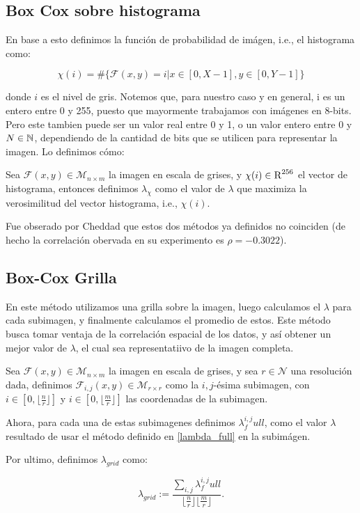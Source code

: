     \subsection{Box Cox sobre histograma}

    En base a esto definimos la funci\'on de probabilidad de im\'agen, i.e., el histograma como:
    
    $$\chi(i)= \# \{\mathcal{F}(x,y)=i | x\in[0,X-1], y\in[0,Y-1] \}$$ 

    donde $i$ es el nivel de gris. Notemos que, para nuestro caso y en general, i es un entero entre 0 y 255, puesto que mayormente trabajamos con im\'agenes en 8-bits. Pero este tambien puede ser un valor real entre 0 y 1, o un valor entero entre 0 y $N\in\mathbb{N}$, dependiendo de la cantidad de bits que se utilicen para representar la imagen. Lo definimos cómo:

    \begin{defn}\label{lambda_hist}
        Sea $\mathcal{F}(x, y)\in\mathcal{M}_{n\times m}$ la imagen en escala de grises, y $\chi(i)\in\textsc{R}^{256}$ el vector de histograma, entonces definimos $\lambda_{\chi}$ como el valor de $\lambda$ que maximiza la verosimilitud del vector histograma, i.e., $\chi(i)$.
    \end{defn}
    
    Fue obserado por Cheddad que estos dos m\'etodos ya definidos no coinciden (de hecho la correlaci\'on obervada en su experimento es $\rho=-0.3022$).

    \subsection{Box-Cox Grilla}

    En este m\'etodo utilizamos una grilla sobre la imagen, luego calculamos el $\lambda$ para cada subimagen, y finalmente calculamos el promedio de estos. Este m\'etodo busca tomar ventaja de la correlaci\'on espacial de los datos, y as\'i obtener un mejor valor de $\lambda$, el cual sea representatiivo de la imagen completa.

    
    \begin{defn}\label{lambda_grid}
        Sea $\mathcal{F}(x, y)\in\mathcal{M}_{n\times m}$ la imagen en escala de grises, y sea $r \in \mathcal{N} $ una resoluci\'on dada, definimos $\mathcal{F}_{i,j}(x, y)\in\mathcal{M}_{r\times r}$ como la $i,j$-ésima subimagen, con $i\in[0,\lfloor\frac{n}{r}\rfloor]$ y $i\in[0,\lfloor\frac{m}{r}\rfloor]$ las coordenadas de la subimagen.
        
        Ahora, para cada una de estas subimagenes definimos $\lambda^{i,j}_full$, como el valor $\lambda$ resultado de usar el m\'etodo definido en \ref{lambda_full} en la subim\'agen.

        Por ultimo, definimos $\lambda_{grid}$ como:
        
        $$
        \lambda_{grid} := \frac{\sum_{i,j} \lambda^{i,j}_full}{\lfloor\frac{n}{r}\rfloor\lfloor\frac{m}{r}\rfloor}.
        $$
    \end{defn}
    

